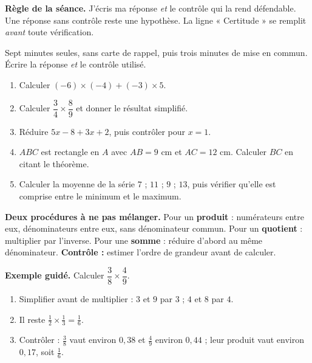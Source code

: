 \documentclass[10pt,a4paper]{article}
\begin{document}
\begin{graybox}\small\textbf{Règle de la séance.} J'écris ma réponse \emph{et} le contrôle qui la rend défendable. Une réponse sans contrôle reste une hypothèse. La ligne « Certitude » se remplit \emph{avant} toute vérification.\end{graybox}
\par\vspace{2mm}
Sept minutes seules, sans carte de rappel, puis trois minutes de mise en commun. Écrire la réponse \emph{et} le contrôle utilisé.
\begin{enumerate}
\item Calculer $(-6)\times(-4) + (-3)\times 5$.
\item Calculer $\dfrac{3}{4}\times\dfrac{8}{9}$ et donner le résultat simplifié.
\item Réduire $5x - 8 + 3x + 2$, puis contrôler pour $x = 1$.
\item $ABC$ est rectangle en $A$ avec $AB = 9$ cm et $AC = 12$ cm. Calculer $BC$ en citant le théorème.
\item Calculer la moyenne de la série $7$ ; $11$ ; $9$ ; $13$, puis vérifier qu'elle est comprise entre le minimum et le maximum.
\end{enumerate}
\certline
\aideline
\needspace{62mm}\par\vspace{3mm}
\begin{methodbox}
\textbf{Deux procédures à ne pas mélanger.} Pour un \textbf{produit} : numérateurs entre eux, dénominateurs
entre eux, sans dénominateur commun. Pour un \textbf{quotient} : multiplier par l'inverse.
Pour une \textbf{somme} : réduire d'abord au même dénominateur.
\textbf{Contrôle :} estimer l'ordre de grandeur avant de calculer.
\end{methodbox}
\begin{graybox}
\textbf{Exemple guidé.} Calculer $\dfrac{3}{8}\times\dfrac{4}{9}$.
\begin{enumerate}
\item Simplifier avant de multiplier : $3$ et $9$ par $3$ ; $4$ et $8$ par $4$.
\item Il reste $\frac{1}{2}\times\frac{1}{3}=\frac{1}{6}$.
\item Contrôler : $\frac38$ vaut environ $0{,}38$ et $\frac49$ environ $0{,}44$ ; leur produit vaut environ $0{,}17$, soit $\frac16$.
\end{enumerate}
\end{graybox}
\end{document}
